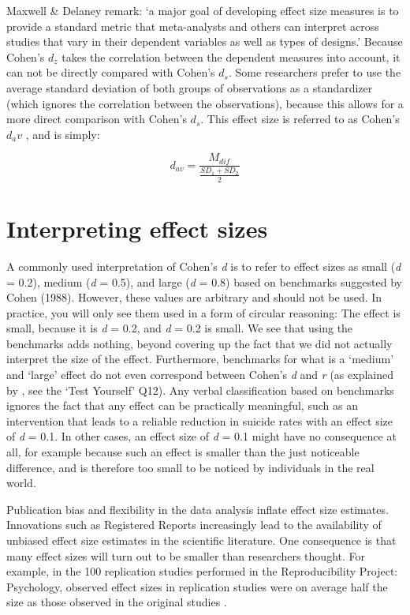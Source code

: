 \documentclass[
  oneside]{book}
\begin{document}
Maxwell \& Delaney \citeyearpar{maxwell_designing_2004} remark: `a major goal of developing effect size measures is to provide a standard metric that meta-analysts and others can interpret across studies that vary in their dependent variables as well as types of designs.' Because Cohen's \(d_z\) takes the correlation between the dependent measures into account, it can not be directly compared with Cohen's \(d_s\). Some researchers prefer to use the average standard deviation of both groups of observations as a standardizer (which ignores the correlation between the observations), because this allows for a more direct comparison with Cohen's \(d_s\). This effect size is referred to as Cohen's \(d_av\) \citep{cumming_understanding_2013}, and is simply:

\[d_{av} = \frac{M_{dif}}{\frac{SD_1+SD_2}{2}}\]

\hypertarget{interpreting-effect-sizes}{%
\section{Interpreting effect sizes}\label{interpreting-effect-sizes}}

A commonly used interpretation of Cohen's \emph{d} is to refer to effect sizes as small (\emph{d} = 0.2), medium (\emph{d} = 0.5), and large (\emph{d} = 0.8) based on benchmarks suggested by Cohen (1988). However, these values are arbitrary and should not be used. In practice, you will only see them used in a form of circular reasoning: The effect is small, because it is \emph{d} = 0.2, and \emph{d} = 0.2 is small. We see that using the benchmarks adds nothing, beyond covering up the fact that we did not actually interpret the size of the effect. Furthermore, benchmarks for what is a `medium' and `large' effect do not even correspond between Cohen's \emph{d} and \emph{r} (as explained by \citet{mcgrath_when_2006}, see the `Test Yourself' Q12). Any verbal classification based on benchmarks ignores the fact that any effect can be practically meaningful, such as an intervention that leads to a reliable reduction in suicide rates with an effect size of \emph{d} = 0.1. In other cases, an effect size of \emph{d} = 0.1 might have no consequence at all, for example because such an effect is smaller than the just noticeable difference, and is therefore too small to be noticed by individuals in the real world.

Publication bias and flexibility in the data analysis inflate effect size estimates. Innovations such as Registered Reports \citep{chambers_past_2022, nosek_registered_2014} increasingly lead to the availability of unbiased effect size estimates in the scientific literature. One consequence is that many effect sizes will turn out to be smaller than researchers thought. For example, in the 100 replication studies performed in the Reproducibility Project: Psychology, observed effect sizes in replication studies were on average half the size as those observed in the original studies \citep{open_science_collaboration_estimating_2015}.
\end{document}
